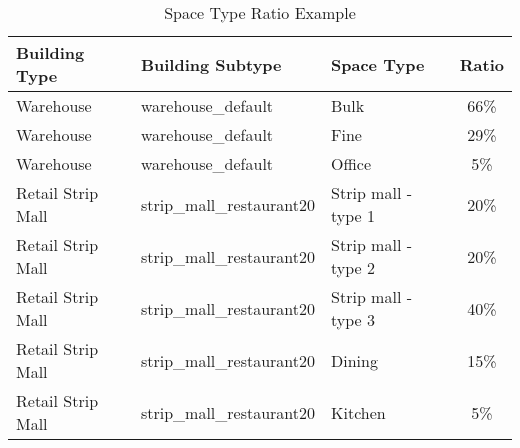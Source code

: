 \begin{table}
\small
\caption[Space Type Ratio Example]{Space Type Ratio Example}
\label{tab:space_type_ratios}
\centering
\begin{tabular}{|l|l|l|c|}
\hline
\textbf{Building Type} & \textbf{Building Subtype} & \textbf{Space Type} & \textbf{Ratio} \\ \hline
Warehouse & warehouse\_default & Bulk & 66\% \\ \hline
Warehouse & warehouse\_default & Fine & 29\% \\ \hline
Warehouse & warehouse\_default & Office & 5\% \\ \hline
Retail Strip Mall & strip\_mall\_restaurant20 & Strip mall - type 1 & 20\% \\ \hline
Retail Strip Mall & strip\_mall\_restaurant20 & Strip mall - type 2 & 20\% \\ \hline
Retail Strip Mall & strip\_mall\_restaurant20 & Strip mall - type 3 & 40\% \\ \hline
Retail Strip Mall & strip\_mall\_restaurant20 & Dining & 15\% \\ \hline
Retail Strip Mall & strip\_mall\_restaurant20 & Kitchen & 5\% \\ \hline
\end{tabular}
\end{table}